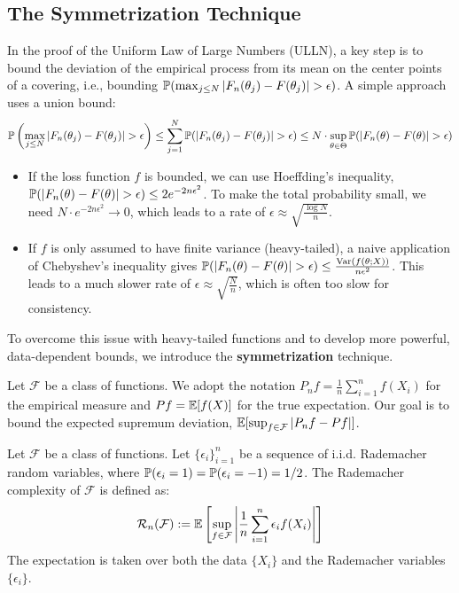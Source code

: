 \subsection{The Symmetrization Technique}
In the proof of the Uniform Law of Large Numbers (ULLN), a key step is to bound the deviation of the empirical process from its mean on the center points of a covering, i.e., bounding $\mathbb{P}(\max_{j \le N} |F_n(\theta_j) - F(\theta_j)| > \epsilon)$. A simple approach uses a union bound:
$$ \mathbb{P}\left(\max_{j \le N} |F_n(\theta_j) - F(\theta_j)| > \epsilon\right) \le \sum_{j=1}^N \mathbb{P}(|F_n(\theta_j) - F(\theta_j)| > \epsilon) \le N \cdot \sup_{\theta \in \Theta} \mathbb{P}(|F_n(\theta) - F(\theta)| > \epsilon) $$
\begin{itemize}
    \item If the loss function $f$ is bounded, we can use Hoeffding's inequality, $\mathbb{P}(|F_n(\theta) - F(\theta)| > \epsilon) \le 2e^{-2n\epsilon^2}$. To make the total probability small, we need $N \cdot e^{-2n\epsilon^2} \to 0$, which leads to a rate of $\epsilon \approx \sqrt{\frac{\log N}{n}}$.
    \item If $f$ is only assumed to have finite variance (heavy-tailed), a naive application of Chebyshev's inequality gives $\mathbb{P}(|F_n(\theta) - F(\theta)| > \epsilon) \le \frac{\text{Var}(f(\theta; X))}{n\epsilon^2}$. This leads to a much slower rate of $\epsilon \approx \sqrt{\frac{N}{n}}$, which is often too slow for consistency.
\end{itemize}
To overcome this issue with heavy-tailed functions and to develop more powerful, data-dependent bounds, we introduce the \textbf{symmetrization} technique.

Let $\mathcal{F}$ be a class of functions. We adopt the notation $P_n f = \frac{1}{n}\sum_{i=1}^n f(X_i)$ for the empirical measure and $Pf = \mathbb{E}[f(X)]$ for the true expectation. Our goal is to bound the expected supremum deviation, $\mathbb{E}[\sup_{f \in \mathcal{F}} |P_n f - Pf|]$.

\begin{de}
Let $\mathcal{F}$ be a class of functions. Let $\{\epsilon_i\}_{i=1}^n$ be a sequence of i.i.d. Rademacher random variables, where $\mathbb{P}(\epsilon_i = 1) = \mathbb{P}(\epsilon_i = -1) = 1/2$. The Rademacher complexity of $\mathcal{F}$ is defined as:
$$ \mathcal{R}_n(\mathcal{F}) := \mathbb{E}\left[ \sup_{f \in \mathcal{F}} \left| \frac{1}{n} \sum_{i=1}^n \epsilon_i f(X_i) \right| \right] $$
The expectation is taken over both the data $\{X_i\}$ and the Rademacher variables $\{\epsilon_i\}$.
\end{de}

